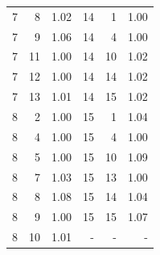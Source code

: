 \begin{table}
\begin{tabular}{|r|r|r||r|r|r|}
      7 &   8 &      1.02 &  14 &   1 &      1.00 \\
      7 &   9 &      1.06 &  14 &   4 &      1.00 \\
      7 &  11 &      1.00 &  14 &  10 &      1.02 \\
      7 &  12 &      1.00 &  14 &  14 &      1.02 \\
      7 &  13 &      1.01 &  14 &  15 &      1.02 \\
      8 &   2 &      1.00 &  15 &   1 &      1.04 \\
      8 &   4 &      1.00 &  15 &   4 &      1.00 \\
      8 &   5 &      1.00 &  15 &  10 &      1.09 \\
      8 &   7 &      1.03 &  15 &  13 &      1.00 \\
      8 &   8 &      1.08 &  15 &  14 &      1.04 \\
      8 &   9 &      1.00 &  15 &  15 &      1.07 \\
      8 &  10 &      1.01 &   - &   - &         - \\
    \hline
    \end{tabular}
\end{table}

